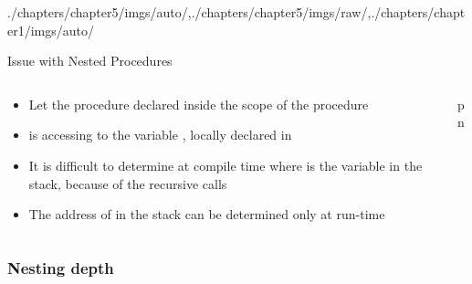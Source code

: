 \begin{graphicspathcontext}{{./chapters/chapter5/imgs/auto/},{./chapters/chapter5/imgs/raw/},{./chapters/chapter1/imgs/auto/}}
\begin{bibunit}[apalike]
\begin{frame}{Issue with Nested Procedures}
	\begin{footnotesize}
		\vfill
		\begin{example}
			\begin{columns}
				\begin{column}[t]{.6\linewidth}
					\begin{itemize}
						\item Let the procedure  declared inside the scope of the procedure 
						\item {} is accessing to the variable , locally declared in 
						\item It is difficult to determine at compile time where is the variable  in the stack, because of the recursive calls
						\item The address of  in the stack can be determined only at run-time
					\end{itemize}
				\end{column}
				\begin{column}[t]{.4\linewidth}
					\begin{scriptsize}
						\begin{myprocedure}{p}{n}
						\end{myprocedure}
					\end{scriptsize}
				\end{column}
			\end{columns}
		\end{example}
	\end{footnotesize}
\end{frame}


\subsubsection{Nesting depth}
\subsubsectiontableofcontentslide


\end{bibunit}
\end{graphicspathcontext}
